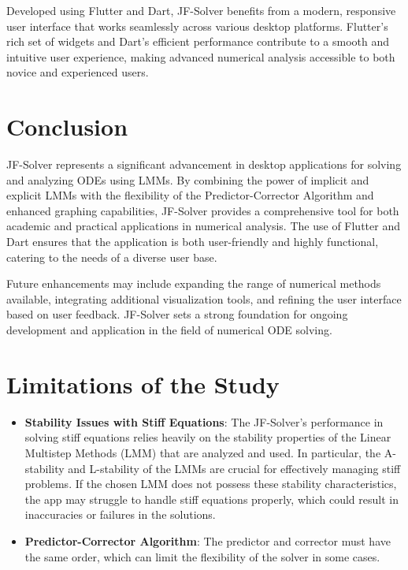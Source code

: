 \documentclass[a4paper, twoside]{report} %
\begin{document}
	Developed using Flutter and Dart, JF-Solver benefits from a modern, responsive user interface that works seamlessly across various desktop platforms. Flutter’s rich set of widgets and Dart’s efficient performance contribute to a smooth and intuitive user experience, making advanced numerical analysis accessible to both novice and experienced users.

	\section{Conclusion}

	JF-Solver represents a significant advancement in desktop applications for solving and analyzing ODEs using LMMs. By combining the power of implicit and explicit LMMs with the flexibility of the Predictor-Corrector Algorithm and enhanced graphing capabilities, JF-Solver provides a comprehensive tool for both academic and practical applications in numerical analysis. The use of Flutter and Dart ensures that the application is both user-friendly and highly functional, catering to the needs of a diverse user base.

	Future enhancements may include expanding the range of numerical methods available, integrating additional visualization tools, and refining the user interface based on user feedback. JF-Solver sets a strong foundation for ongoing development and application in the field of numerical ODE solving.


	\section{Limitations of the Study}
	\begin{itemize}
		\item \textbf{Stability Issues with Stiff Equations}: The JF-Solver's performance in solving stiff equations relies heavily on the stability properties of the Linear Multistep Methods (LMM) that are analyzed and used. In particular, the A-stability and L-stability of the LMMs are crucial for effectively managing stiff problems. If the chosen LMM does not possess these stability characteristics, the app may struggle to handle stiff equations properly, which could result in inaccuracies or failures in the solutions.
		\item \textbf{Predictor-Corrector Algorithm}: The predictor and corrector must have the same order, which can limit the flexibility of the solver in some cases.
	\end{itemize}
\end{document}

